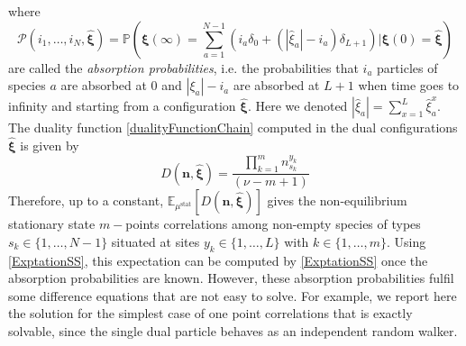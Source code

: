\documentclass[10pt]{article}
\numberwithin{equation}{section}
\numberwithin{equation}{subsection}
\begin{document}
where 
\begin{equation}\label{Pass}
	\mathcal{P}(i_{1},\ldots,i_{N},\hat{\bm{\xi}})	=\mathbb{P}\left(\bm{\xi}(\infty)=\sum_{a=1}^{N-1}\left(i_{a}\delta_{0}+(|\hat{\xi}_{a}|-i_{a})\delta_{L+1}\right)| \bm{\xi}(0)=\hat{\bm{\xi}}\right)
\end{equation}
are called the \textit{absorption probabilities}, i.e. the probabilities that $i_{a}$ particles of species $a$ are absorbed at $0$ and $|\xi_{a}|-i_{a}$ are absorbed at $L+1$ when time goes to infinity and starting from a configuration $\hat{\bm{\xi}}$. Here we denoted $|\hat{\xi}_{a}|=\sum_{x=1}^{L}\hat{\xi}_{a}^{x}$.
The duality function \eqref{dualityFunctionChain} computed in the dual configurations $\bm{\hat{\xi}}$ is given by 
\begin{equation}
	D(\bm{n},\bm{\hat{\xi}})= \frac{\prod_{k=1}^{m}n_{s_{k}}^{y_{k}}}{(\nu-m+1)}
\end{equation}
Therefore, up to a constant, $\mathbb{E}_{\mu^{\text{stat}}}\left[D(\bm{n},\bm{\hat{\xi}})\right]$ gives the non-equilibrium stationary state $m-$points correlations among non-empty species of types $s_{k}\in\{1,\ldots,N-1\}$ situated at sites $y_{k}\in\{1,\ldots,L\}$ with $k\in \{1,\ldots,m\}$. Using \eqref{ExptationSS}, this expectation can be computed by \eqref{ExptationSS} once the absorption probabilities are known. However, these absorption probabilities fulfil some difference equations that are not easy to solve. For example, we report here the solution for the simplest case of one point correlations that is exactly solvable, since the single dual particle behaves as an independent random walker. 
\end{document}
